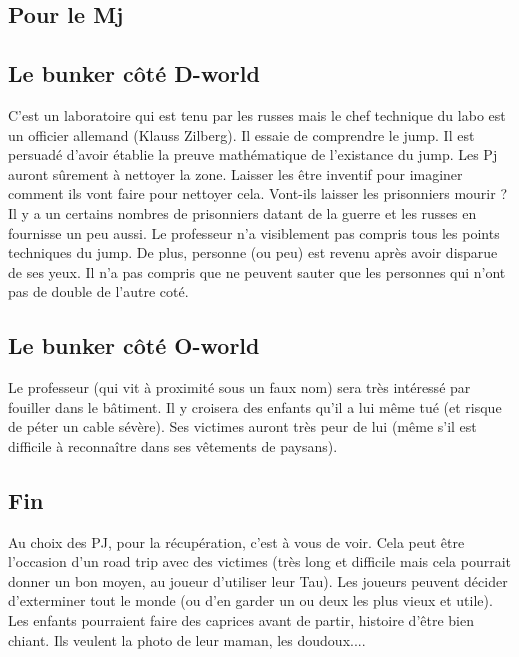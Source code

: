 \documentclass[oneside,12pt]{book}
\begin{document}
\begin{flushleft}
\section{Pour le Mj}

\subsection{Le bunker côté D-world}
C’est un laboratoire qui est tenu par les russes mais le chef technique du labo est un officier allemand (Klauss Zilberg). Il essaie de comprendre le jump. Il est persuadé d’avoir établie la preuve mathématique de l’existance du jump. Les Pj auront sûrement à nettoyer la zone.
Laisser les être inventif pour imaginer comment ils vont faire pour nettoyer cela. Vont-ils laisser les prisonniers mourir ? Il y a un certains nombres de prisonniers datant de la guerre et les russes en fournisse un peu aussi.
Le professeur n’a visiblement pas compris tous les points techniques du jump. De plus, personne (ou peu) est revenu après avoir disparue de ses yeux. Il n’a pas compris que ne peuvent sauter que les personnes qui n’ont pas de double de l’autre coté.

\subsection{Le bunker côté O-world}
Le professeur (qui vit à proximité sous un faux nom) sera très intéressé par fouiller dans le bâtiment.
Il y croisera des enfants qu’il a lui même tué (et risque de péter un cable sévère). Ses victimes auront très peur de lui (même s’il est difficile à reconnaître dans ses vêtements de paysans).  

\subsection{Fin}
Au choix des PJ, pour la récupération, c’est à vous de voir. Cela peut être l’occasion d’un road trip avec des victimes (très long et difficile mais cela pourrait donner un bon moyen, au joueur d’utiliser leur Tau). Les joueurs peuvent décider d’exterminer tout le monde (ou d’en garder un ou deux les plus vieux et utile). Les enfants pourraient faire des caprices avant de partir, histoire d’être bien chiant. Ils veulent la photo de leur maman, les doudoux....




















\end{flushleft}
\end{document}
